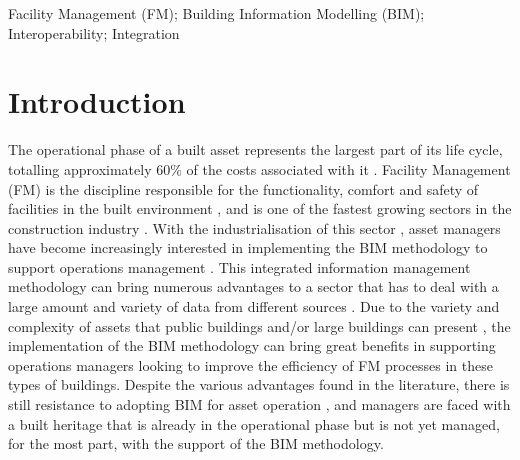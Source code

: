 \documentclass[a4paper, 10pt, twocolumn, twoside]{article}
\begin{document}
\begin{keywords}
Facility Management (FM); Building Information Modelling (BIM); Interoperability; Integration
\end{keywords}


\section{Introduction}
\label{sec:Introduction}

The operational phase of a built asset represents the largest part of its life cycle, totalling approximately 60\% of the costs associated with it \cite{Al-Kasasbeh2021}. Facility Management (FM) is the discipline responsible for the functionality, comfort and safety of facilities in the built environment \cite{IFMA2023}, and is one of the fastest growing sectors in the construction industry \cite{Pinti2022}. With the industrialisation of this sector \cite{Marocco2021}, asset managers have become increasingly interested in implementing the BIM methodology to support operations management \cite{Pinti2022}. This integrated information management methodology can bring numerous advantages to a sector that has to deal with a large amount and variety of data from different sources \cite{Siccardi2023}. Due to the variety and complexity of assets that public buildings and/or large buildings can present \cite{Pinti2022}, the implementation of the BIM methodology can bring great benefits in supporting operations managers looking to improve the efficiency of FM processes in these types of buildings. Despite the various advantages found in the literature, there is still resistance to adopting BIM for asset operation \cite{Durdyev2022}, and managers are faced with a built heritage that is already in the operational phase but is not yet managed, for the most part, with the support of the BIM methodology.
\end{document}
